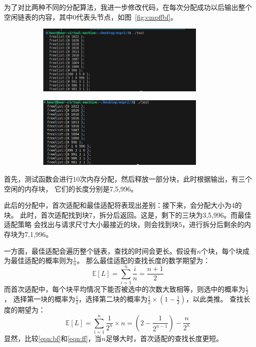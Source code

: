 \documentclass[a4paper,twoside]{article}
\begin{document}
\begin{spacing}{1.2}
为了对比两种不同的分配算法，我进一步修改代码，在每次分配成功以后输出整个空闲链表的内容，其中0代表头节点，如图~\ref{fig:cmpffbf}。
\begin{figure}[htb]
	\centering
	\caption{使用不同的策略分配内存}
	\label{fig:cmpffbf}
	\begin{subfigure}{0.45\textwidth}
		\includegraphics[width=0.9\textwidth]{images/ff_fl.png}
	\end{subfigure}
	\begin{subfigure}{0.45\textwidth}
		\includegraphics[width=0.9\textwidth]{images/bf_fl.png}
	\end{subfigure}
\end{figure}
首先，测试函数会进行10次内存分配，然后释放一部分块，此时根据输出，有三个空闲的内存块，
它们的长度分别是7,5,996。

此后的分配中，首次适配和最佳适配将表现出差别：接下来，会分配大小为4的块。
此时，首次适配找到块7，拆分后返回。这是，剩下的三块为3,5,996。而最佳适配策略
会找出与请求尺寸大小最接近的块，则会找到块5，进行拆分后剩余的内存块为7,1,996。

一方面，最佳适配会遍历整个链表，查找的时间会更长。假设有$n$个块，每个块成为最佳适配的概率则为$\frac{1}{n}$。
那么最佳适配的查找长度的数学期望为：
\begin{equation}
	\label{eqn:bf}
 	\mathbb{E}[L] = \sum_{i=1}^{n} \frac{i}{n} = \frac{n+1}{2}
\end{equation}
而首次适配中，每个块平均情况下能否被选中的次数大致相等，则选中的概率为$\frac{1}{2}$，
选择第一块的概率为$\frac{1}{2}$，选择第二块的概率为$\frac{1}{2}\times \left(1-\frac{1}{2}\right)$，以此类推。
查找长度的期望为：
\begin{equation}
	\label{eqn:ff}
 	\mathbb{E}[L] = \sum_{i=1}^{n} \frac{1}{2^n}\times n = \left(2-\frac{1}{2^{n-1}}\right)-\frac{n}{2^n}
\end{equation}
显然，比较\eqref{eqn:bf}和\eqref{eqn:ff}，当$n$足够大时，首次适配的查找长度更短。


\end{spacing}
\end{document}
